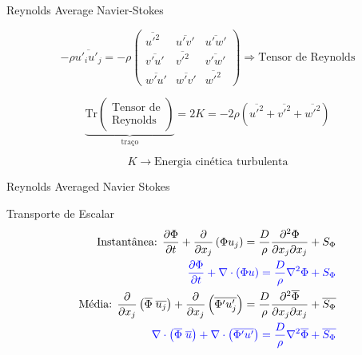 \documentclass[10pt]{beamer}
\newcommand{\ddt}[1]{\dfrac{\partial #1}{\partial t}}
\newcommand{\ddxp}[2]{\dfrac{\partial }{\partial x_{#2}}\left(#1\right)}
\newcommand{\laplace}[1]{\dfrac{\partial^2 #1}{\partial x_{j}\partial x_{j}}}
\newcommand{\m}[1]{\overline{#1}}
\newcommand{\divp}[1]{\nabla \cdot \left(#1\right)}
\newcommand{\blue}[1]{{\color{blue}#1}}
\begin{document}
\begin{frame}{Reynolds Average Navier-Stokes}

	\begin{equation*}
	-\rho \m{u'_i u'_j} = -\rho \begin{pmatrix}
	\m{u'^2} & \m{u'v'} & \m{u'w'} \\
	\m{v'u'} & \m{v'^2} & \m{v'w'} \\
	\m{w'u'} & \m{w'v'} & \m{w'^2}
	\end{pmatrix} \Rightarrow \text{Tensor de Reynolds}
	\end{equation*}
	
	\begin{equation*}
	\underbrace{\text{Tr}\begin{pmatrix}
	\text{Tensor de} \\ \text{Reynolds}
	\end{pmatrix}}_{\text{traço}} = 2 K = -2 \rho \left(\m{u'^2} + \m{v'^2} + \m{w'^2}\right)
	\end{equation*}
	
	\begin{equation*}
	K \rightarrow \text{Energia cinética turbulenta}
	\end{equation*}
\end{frame}

\begin{frame}{Reynolds Averaged Navier Stokes}
	
	\begin{block}{Transporte de Escalar}
		\begin{align*}
		\text{Instantânea: }\ddt{\Phi} +\ddxp{\Phi u_j}{j} = \dfrac{D}{\rho}\laplace{\Phi} + S_{\Phi} \\
		\blue{\ddt{\Phi} +\divp{\Phi u} = \dfrac{D}{\rho}\nabla^2\Phi+ S_{\Phi}} \\
		\text{Média: }\ddxp{\m{\Phi}\;\m{u_j}}{j} + \ddxp{\m{\Phi' u'_j}}{j} = \dfrac{D}{\rho}\laplace{\m{\Phi}} + \m{S_{\Phi}} \\
		\blue{\divp{\m{\Phi}\;\m{u}} + \divp{\m{\Phi' u'}} = \dfrac{D}{\rho}\nabla^2\m{\Phi} + \m{S_{\Phi}}}
		\end{align*}
	\end{block}
\end{frame}
\end{document}
